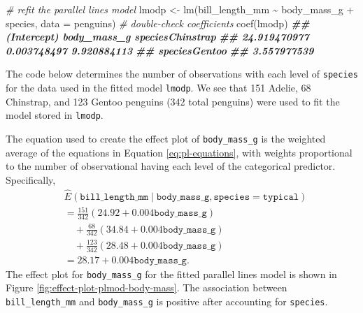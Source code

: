 \documentclass[
]{book}
\newenvironment{Shaded}{\begin{snugshade}}{\end{snugshade}}
\newcommand{\AttributeTok}[1]{\textcolor[rgb]{0.77,0.63,0.00}{#1}}
\newcommand{\CommentTok}[1]{\textcolor[rgb]{0.56,0.35,0.01}{\textit{#1}}}
\newcommand{\DocumentationTok}[1]{\textcolor[rgb]{0.56,0.35,0.01}{\textbf{\textit{#1}}}}
\newcommand{\FunctionTok}[1]{\textcolor[rgb]{0.00,0.00,0.00}{#1}}
\newcommand{\NormalTok}[1]{#1}
\newcommand{\OtherTok}[1]{\textcolor[rgb]{0.56,0.35,0.01}{#1}}
\newcommand{\SpecialCharTok}[1]{\textcolor[rgb]{0.00,0.00,0.00}{#1}}
\theoremstyle{definition}
\theoremstyle{definition}
\theoremstyle{definition}
\theoremstyle{definition}
\theoremstyle{remark}
\begin{document}
\begin{Shaded}
\begin{Highlighting}[]
\CommentTok{\# refit the parallel lines model}
\NormalTok{lmodp }\OtherTok{\textless{}{-}} \FunctionTok{lm}\NormalTok{(bill\_length\_mm }\SpecialCharTok{\textasciitilde{}}\NormalTok{ body\_mass\_g }\SpecialCharTok{+}\NormalTok{ species, }\AttributeTok{data =}\NormalTok{ penguins)}
\CommentTok{\# double{-}check coefficients}
\FunctionTok{coef}\NormalTok{(lmodp)}
\DocumentationTok{\#\#      (Intercept)      body\_mass\_g speciesChinstrap }
\DocumentationTok{\#\#     24.919470977      0.003748497      9.920884113 }
\DocumentationTok{\#\#    speciesGentoo }
\DocumentationTok{\#\#      3.557977539}
\end{Highlighting}
\end{Shaded}

The code below determines the number of observations with each level of
\texttt{species} for the data used in the fitted model \texttt{lmodp}. We see that 151
Adelie, 68 Chinstrap, and 123 Gentoo penguins (342 total penguins) were
used to fit the model stored in \texttt{lmodp}.

\begin{Shaded}
\end{Shaded}

The equation used to create the effect plot of \texttt{body\_mass\_g} is the
weighted average of the equations in Equation \eqref{eq:pl-equations},
with weights proportional to the number of observational having each
level of the categorical predictor. Specifically, \[
\begin{aligned}
& \hat{E}(\mathtt{bill\_length\_mm} \mid \mathtt{body\_mass\_g}, \mathtt{species}=\mathtt{typical}) \\
&= \frac{151}{342}(24.92 + 0.004 \mathtt{body\_mass\_g})\\
&\quad + \frac{68}{342}(34.84 + 0.004 \mathtt{body\_mass\_g})\\
&\quad + \frac{123}{342}(28.48 + 0.004 \mathtt{body\_mass\_g}) \\
&=28.17 + 0.004 \mathtt{body\_mass\_g}.
\end{aligned}
\] The effect plot for \texttt{body\_mass\_g} for the fitted parallel lines model
is shown in Figure \ref{fig:effect-plot-plmod-body-mass}. The
association between \texttt{bill\_length\_mm} and \texttt{body\_mass\_g} is positive after
accounting for \texttt{species}.
\end{document}
